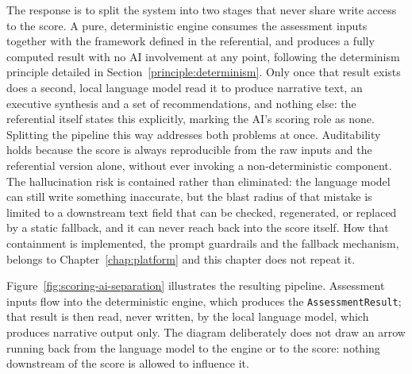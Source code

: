 The response is to split the system into two stages that never share write
access to the score. A pure, deterministic engine consumes the assessment
inputs together with the framework defined in the referential, and
produces a fully computed result with no AI involvement at any point,
following the determinism principle detailed in Section~\ref{principle:determinism}.
Only once that result exists does a second, local language model read it
to produce narrative text, an executive synthesis and a set of
recommendations, and nothing else: the referential itself states this
explicitly, marking the AI's scoring role as none. Splitting the pipeline
this way addresses both problems at once. Auditability holds because the
score is always reproducible from the raw inputs and the referential
version alone, without ever invoking a non-deterministic component. The
hallucination risk is contained rather than eliminated: the language model
can still write something inaccurate, but the blast radius of that mistake
is limited to a downstream text field that can be checked, regenerated, or
replaced by a static fallback, and it can never reach back into the score
itself. How that containment is implemented, the prompt guardrails and the
fallback mechanism, belongs to Chapter~\ref{chap:platform} and this
chapter does not repeat it.

Figure~\ref{fig:scoring-ai-separation} illustrates the resulting pipeline.
Assessment inputs flow into the deterministic engine, which produces the
\texttt{Assessment\allowbreak Result}; that result is then read, never written, by the local
language model, which produces narrative output only. The diagram
deliberately does not draw an arrow running back from the language model
to the engine or to the score: nothing downstream of the score is allowed
to influence it.

